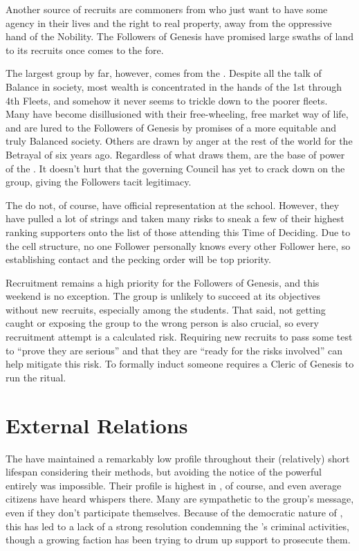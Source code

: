 \documentclass[blue]{GL2020}
\begin{document}
Another source of recruits are commoners from \pFarm{} who just want to have some agency in their lives and the right to real property, away from the oppressive hand of the Nobility. The Followers of Genesis have promised large swaths of land to its \pFarm{} recruits once \cGenesis{} comes to the fore.

The largest group by far, however, comes from the \pShip{}. Despite all the talk of Balance in \pShip{} society, most wealth is concentrated in the hands of the 1st through 4th Fleets, and somehow it never seems to trickle down to the poorer fleets. Many \pShippies{} have become disillusioned with their free-wheeling, free market way of life, and are lured to the Followers of Genesis by promises of a more equitable and truly Balanced society. Others are drawn by anger at the rest of the world for the Betrayal of six years ago. Regardless of what draws them, \pShippies{} are the base of power of the \pGoaties{}. It doesn’t hurt that the governing Council has yet to crack down on the group, giving the Followers tacit legitimacy.

The \pGoaties{} do not, of course, have official representation at the school. However, they have pulled a lot of strings and taken many risks to sneak a few of their highest ranking supporters onto the list of those attending this Time of Deciding. Due to the cell structure, no one Follower personally knows every other Follower here, so establishing contact and the pecking order will be top priority. 

Recruitment remains a high priority for the Followers of Genesis, and this weekend is no exception. The group is unlikely to succeed at its objectives without new recruits, especially among the students. That said, not getting caught or exposing the group to the wrong person is also crucial, so every recruitment attempt is a calculated risk. Requiring new recruits to pass some test to “prove they are serious'' and that they are “ready for the risks involved'' can help mitigate this risk. To formally induct someone requires a Cleric of Genesis to run the ritual.

\section*{External Relations}
The \pGoaties{} have maintained a remarkably low profile throughout their (relatively) short lifespan considering their methods, but avoiding the notice of the powerful entirely was impossible. Their profile is highest in \pShip{}, of course, and even average citizens have heard whispers there. Many \pShippies{} are sympathetic to the group's message, even if they don’t participate themselves. Because of the democratic nature of \pShip{}, this has led to a lack of a strong resolution condemning the \pGoaties{}'s criminal activities, though a growing faction has been trying to drum up support to prosecute them.
\end{document}
